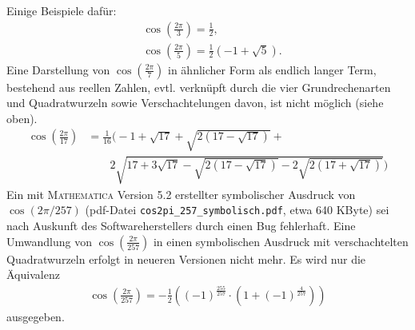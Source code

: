 \documentclass[11pt]{article}
\newcommand{\br}[1]{\ensuremath{\left(#1\right)}}
\begin{document}
Einige Beispiele dafür:
\begin{align*}  
  &\cos\br{\frac{2\pi}{3}}=\frac{1}{2},\\
  &\cos\br{\frac{2\pi}{5}}=\frac{1}{2}\br{-1+\sqrt{5}}.
\end{align*}
Eine Darstellung von $\cos\br{\frac{2\pi}{7}}$ in ähnlicher Form als endlich
langer Term, bestehend aus reellen Zahlen, evtl. verknüpft durch die vier
Grundrechenarten und Quadratwurzeln sowie Verschachtelungen davon, ist nicht
möglich (siehe oben).
\begin{align*}
  \cos\br{\frac{2\pi}{17}}&= \frac{1}{16}
  \Bigg(-1+\sqrt{17}+\sqrt{{2\br{17-\sqrt{17}}}}+\\ &\qquad
  2\sqrt{17+3\sqrt{17}-\sqrt{2\br{17-\sqrt{17}}}
    -2\sqrt{2\br{17+\sqrt{17}}}}\Bigg)
\end{align*}
Ein mit \textsc{Mathematica} Version 5.2 erstellter symbolischer Ausdruck von
$\cos(2\pi/257)$ (pdf-Datei \texttt{cos2pi\_257\_symbolisch.pdf}, etwa 640
KByte) sei nach Auskunft des Softwareherstellers durch einen Bug fehlerhaft.
Eine Umwandlung von $\cos\br{\frac{2\pi}{257}}$ in einen symbolischen Ausdruck
mit verschachtelten Quadratwurzeln erfolgt in neueren Versionen nicht mehr. Es
wird nur die Äquivalenz
\begin{gather*}
  \cos\br{\frac{2\pi}{257}}= -\frac{1}{2}\br{\br{-1}^{\frac{255}{257}}\cdot
    \br{1+\br{-1}^{\frac{4}{257}}}}
\end{gather*}
ausgegeben.
\end{document}
